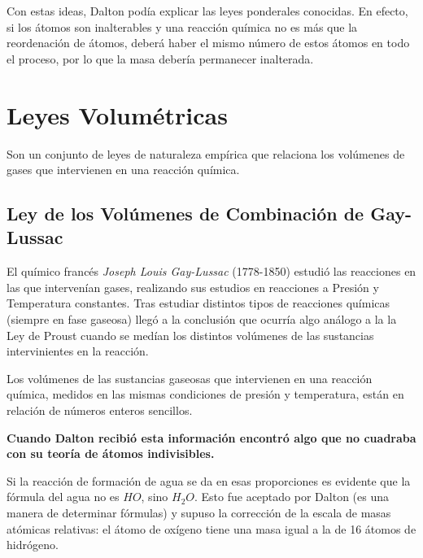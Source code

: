 Con estas ideas, Dalton podía explicar las leyes ponderales conocidas. En efecto, si los átomos son inalterables y una reacción química no es más que la reordenación de átomos, deberá haber el mismo número de estos átomos en todo el proceso, por lo que la masa debería permanecer inalterada.

\section{Leyes Volumétricas}

Son un conjunto de leyes de naturaleza empírica que relaciona los volúmenes de gases que intervienen en una reacción química.

\subsection{Ley de los Volúmenes de Combinación de Gay-Lussac}

El químico francés \emph{Joseph Louis Gay-Lussac} (1778-1850) estudió las reacciones en las que intervenían gases, realizando sus estudios en reacciones a Presión y Temperatura constantes. Tras estudiar distintos tipos de reacciones químicas (siempre en fase gaseosa) llegó a la conclusión que ocurría algo análogo a la la Ley de Proust cuando se medían los distintos volúmenes de las sustancias intervinientes en la reacción.\\



\begin{law}
	Los volúmenes de las sustancias gaseosas que intervienen en una reacción química, medidos en las mismas condiciones de presión y temperatura, están en relación de números enteros sencillos.
\end{law}

\begin{center}
	\textbf{Cuando Dalton recibió esta información encontró algo que no cuadraba con su teoría de átomos indivisibles.}\\
\end{center}

Si la reacción de formación de agua se da en esas proporciones es evidente que la fórmula del agua no es $HO$, sino $H_2O$. Esto fue aceptado por Dalton (es una manera de determinar fórmulas) y supuso la corrección de la escala de masas atómicas relativas: el átomo de oxígeno tiene una masa igual a la de 16 átomos de hidrógeno.\\

